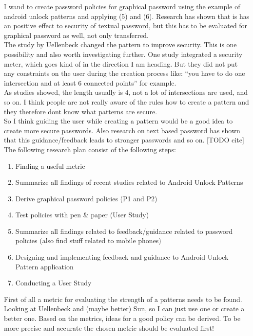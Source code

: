 \documentclass[twocolumn, a4paper, 10pt]{article}
\begin{document}
I wand to create password policies for graphical password using the example of android unlock patterns and applying (5) and (6). Research has shown that is has an positive effect to security of textual password, but this has to be evaluated for graphical password as well, not only transferred.\\

The study by Uellenbeck changed the pattern to improve security. This is one possibility and also worth investigating further. One study integrated a security meter, which goes kind of in the direction I am heading. But they did not put any constraints on the user during the creation process like: ``you have to do one intersection and at least 6 connected points'' for example.\\

As studies showed, the length usually is 4, not a lot of intersections are used, and so on. I think people are not really aware of the rules how to create a pattern and they therefore dont know what patterns are secure.\\

So I think guiding the user while creating a pattern would be a good idea to create more secure passwords. Also research on text based password has shown that this guidance/feedback leads to stronger passwords and so on. [TODO cite]\\

The following research plan consist of the following steps:\\

\begin{enumerate}
\item Finding a useful metric
\item Summarize all findings of recent studies related to Android Unlock Patterns
\item Derive graphical password policies (P1 and P2)
\item Test policies with pen \& paper (User Study)
\item Summarize all findings related to feedback/guidance related to password policies (also find stuff related to mobile phones)
\item Designing and implementing feedback and guidance to Android Unlock Pattern application
\item Conducting a User Study
\end{enumerate}

First of all a metric for evaluating the strength of a patterns needs to be found. Looking at Uellenbeck and (maybe better) Sun, so I can just use one or create a better one. Based on the metrics, ideas for a good policy can be derived. To be more precise and accurate the chosen metric should be evaluated first!\\
\end{document}
